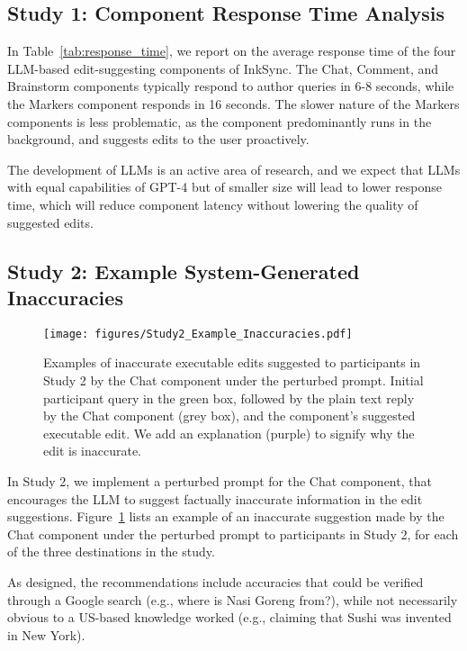 \documentclass[manuscript]{acmart}
\begin{document}
\subsection{Study 1: Component Response Time Analysis} \label{app:study1_response_time}



In Table~\ref{tab:response_time}, we report on the average response time of the four LLM-based edit-suggesting components of InkSync. The Chat, Comment, and Brainstorm components typically respond to author queries in 6-8 seconds, while the Markers component responds in 16 seconds. The slower nature of the Markers components is less problematic, as the component predominantly runs in the background, and suggests edits to the user proactively.

The development of LLMs is an active area of research, and we expect that LLMs with equal capabilities of GPT-4 but of smaller size will lead to lower response time, which will reduce component latency without lowering the quality of suggested edits.

\subsection{Study 2: Example System-Generated Inaccuracies} \label{app:study2_inaccuracies}

\begin{figure}
    \centering
    \texttt{[image: figures/Study2\_Example\_Inaccuracies.pdf]}
    \caption{Examples of inaccurate executable edits suggested to participants in Study 2 by the Chat component under the perturbed prompt. Initial participant query in the green box, followed by the plain text reply by the Chat component (grey box), and the component's suggested executable edit. We add an explanation (purple) to signify why the edit is inaccurate.}
    \label{fig:study2_example_inaccuracies}
\end{figure}

In Study 2, we implement a perturbed prompt for the Chat component, that encourages the LLM to suggest factually inaccurate information in the edit suggestions. Figure~\ref{fig:study2_example_inaccuracies} lists an example of an inaccurate suggestion made by the Chat component under the perturbed prompt to participants in Study 2, for each of the three destinations in the study.

As designed, the recommendations include accuracies that could be verified through a Google search (e.g., where is Nasi Goreng from?), while not necessarily obvious to a US-based knowledge worked (e.g., claiming that Sushi was invented in New York).
\end{document}
